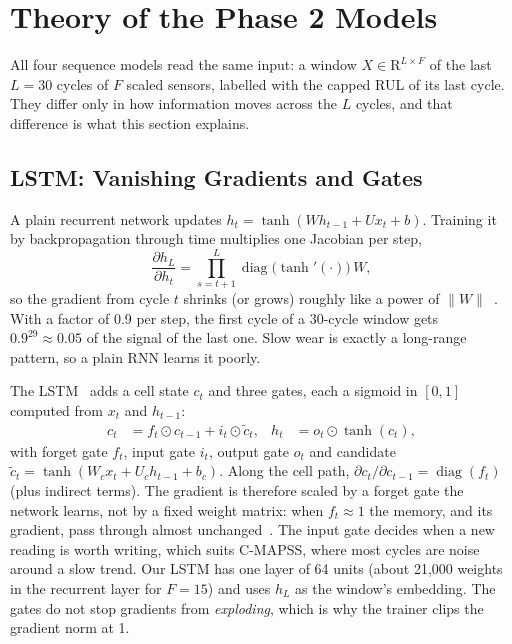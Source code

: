 
\section{Theory of the Phase 2 Models}
\label{sec:theory}

All four sequence models read the same input: a window $X\in\mathrm{R}^{L\times F}$
of the last $L=30$ cycles of $F$ scaled sensors, labelled with the capped RUL
of its last cycle. They differ only in how information moves across the $L$
cycles, and that difference is what this section explains.

\subsection{LSTM: Vanishing Gradients and Gates}
A plain recurrent network updates $h_t=\tanh(Wh_{t-1}+Ux_t+b)$. Training it
by backpropagation through time multiplies one Jacobian per step,
\begin{equation}
\frac{\partial h_L}{\partial h_t}=\prod_{s=t+1}^{L}\operatorname{diag}\!\bigl(\tanh'(\cdot)\bigr)\,W ,
\end{equation}
so the gradient from cycle $t$ shrinks (or grows) roughly like a power of
$\lVert W\rVert$~\cite{Bengio1994learning,Pascanu2013difficulty}. With a
factor of 0.9 per step, the first cycle of a 30-cycle window gets
$0.9^{29}\approx0.05$ of the signal of the last one. Slow wear is exactly a
long-range pattern, so a plain RNN learns it poorly.

The LSTM~\cite{Hochreiter1997long} adds a cell state $c_t$ and three gates,
each a sigmoid in $[0,1]$ computed from $x_t$ and $h_{t-1}$:
\begin{align}
c_t &= f_t\odot c_{t-1} + i_t\odot\tilde c_t, & h_t &= o_t\odot\tanh(c_t),
\end{align}
with forget gate $f_t$, input gate $i_t$, output gate $o_t$ and candidate
$\tilde c_t=\tanh(W_cx_t+U_ch_{t-1}+b_c)$. Along the cell path,
$\partial c_t/\partial c_{t-1}=\operatorname{diag}(f_t)$ (plus indirect
terms). The gradient is therefore scaled by a forget gate the network learns,
not by a fixed weight matrix: when $f_t\approx1$ the memory, and its gradient,
pass through almost unchanged~\cite{Gers2000learning}. The input gate decides
when a new reading is worth writing, which suits C-MAPSS, where most cycles
are noise around a slow trend. Our LSTM has one layer of 64 units (about
21,000 weights in the recurrent layer for $F=15$) and uses $h_L$ as the
window's embedding. The gates do not stop gradients from \emph{exploding},
which is why the trainer clips the gradient norm at 1.

